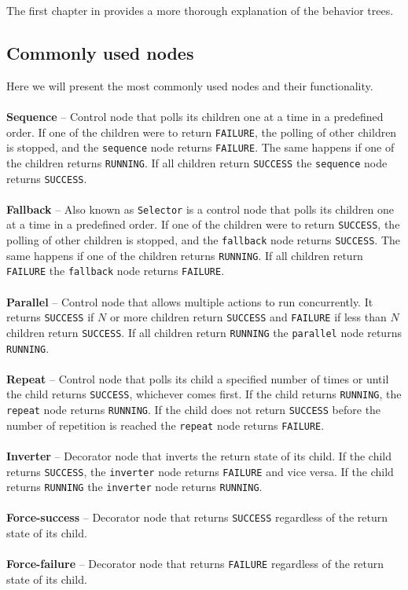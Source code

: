     The first chapter in \cite{BT_intro} provides a more thorough explanation of the behavior trees.

    \subsection{Commonly used nodes}
        Here we will present the most commonly used nodes and their functionality.\\\\
        \textbf{Sequence} -- Control node that polls its children one at a time in a predefined order. If one of the children were to return \texttt{FAILURE}, the polling of other children is stopped, and the \texttt{sequence} node returns \texttt{FAILURE}. The same happens if one of the children returns \texttt{RUNNING}. If all children return \texttt{SUCCESS} the \texttt{sequence} node returns \texttt{SUCCESS}.\\\\
        \textbf{Fallback} -- Also known as \texttt{Selector} is a control node that polls its children one at a time in a predefined order. If one of the children were to return \texttt{SUCCESS}, the polling of other children is stopped, and the \texttt{fallback} node returns \texttt{SUCCESS}. The same happens if one of the children returns \texttt{RUNNING}. If all children return \texttt{FAILURE} the \texttt{fallback} node returns \texttt{FAILURE}.\\\\
        \textbf{Parallel} -- Control node that allows multiple actions to run concurrently. It returns \texttt{SUCCESS} if $N$ or more children return \texttt{SUCCESS} and \texttt{FAILURE} if less than $N$ children return \texttt{SUCCESS}. If all children return \texttt{RUNNING} the \texttt{parallel} node returns \texttt{RUNNING}.\\\\
        \textbf{Repeat} -- Control node that polls its child a specified number of times or until the child returns \texttt{SUCCESS}, whichever comes first. If the child returns \texttt{RUNNING}, the \texttt{repeat} node returns \texttt{RUNNING}. If the child does not return \texttt{SUCCESS} before the number of repetition is reached the \texttt{repeat} node returns \texttt{FAILURE}.\\\\
        \textbf{Inverter} -- Decorator node that inverts the return state of its child. If the child returns \texttt{SUCCESS}, the \texttt{inverter} node returns \texttt{FAILURE} and vice versa. If the child returns \texttt{RUNNING} the \texttt{inverter} node returns \texttt{RUNNING}.\\\\
        \textbf{Force-success} -- Decorator node that returns \texttt{SUCCESS} regardless of the return state of its child.\\\\
        \textbf{Force-failure} -- Decorator node that returns \texttt{FAILURE} regardless of the return state of its child.

